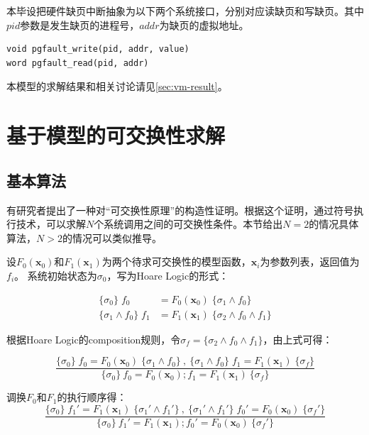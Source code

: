 本毕设把硬件缺页中断抽象为以下两个系统接口，分别对应读缺页和写缺页。其中$pid$参数是发生缺页的进程号，$addr$为缺页的虚拟地址。
\begin{lstlisting}
void pgfault_write(pid, addr, value)
word pgfault_read(pid, addr)
\end{lstlisting}

本模型的求解结果和相关讨论请见\ref{sec:vm-result}。

\section{基于模型的可交换性求解}

\subsection{基本算法}
\label{subsec:comm-alg}
有研究者提出了一种对``可交换性原理''的构造性证明。根据这个证明，通过符号执行技术，可以求解$N$个系统调用之间的可交换性条件。本节给出$N=2$的情况具体算法，$N
> 2$的情况可以类似推导。

设$F_0(\boldsymbol{x}_0)$和$F_1(\boldsymbol{x}_1)$为两个待求可交换性的模型函数，$\boldsymbol{x}_i$为参数列表，返回值为$f_i$。
系统初始状态为$\sigma_0$，写为Hoare Logic\cite{Hoare:1969:ABC:363235.363259}的形式：

\begin{equation}
\label{eq:hoare1}
\begin{aligned}
\{ \sigma_0 \} \; f_0 &= F_0(\boldsymbol{x}_0) \; \{\sigma_1 \land f_0 \} \\
\{ \sigma_1 \land f_0 \} \; f_1 &= F_1(\boldsymbol{x}_1) \; \{\sigma_2 \land f_0 \land
	f_1 \}
\end{aligned}
\end{equation}

根据Hoare Logic的composition规则，令$\sigma_f = \{\sigma_2 \land f_0 \land
	f_1 \}$，由上式可得：

\begin{equation}
\label{eq:hoare2}
\frac
{ \{ \sigma_0 \} \; f_0 = F_0(\boldsymbol{x}_0) \; \{\sigma_1 \land f_0 \}\ , \
\{ \sigma_1 \land f_0 \} \; f_1 = F_1(\boldsymbol{x}_1) \; \{ \sigma_f \} }
{\{ \sigma_0 \}\ f_0 = F_0(\boldsymbol{x}_0);f_1 = F_1(\boldsymbol{x}_1) \ \{ \sigma_f
\}}
\end{equation}

调换$F_0$和$F_1$的执行顺序得：
\begin{equation}
\label{eq:hoare3}
\frac
{ \{ \sigma_0 \} \; f_1' = F_1(\boldsymbol{x}_1) \; \{\sigma_1' \land f_1' \}\ , \
\{ \sigma_1' \land f_1' \} \; f_0' = F_0(\boldsymbol{x}_0) \; \{ \sigma_f' \} }
{\{ \sigma_0 \}\ f_1' = F_1(\boldsymbol{x}_1);f_0' = F_0(\boldsymbol{x}_0) \
\{ \sigma_f' \}}
\end{equation}

